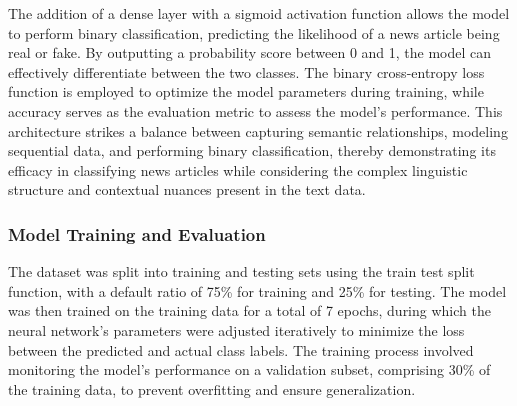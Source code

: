 The addition of a dense layer with a sigmoid activation function allows the model to perform binary classification, predicting the likelihood of a news article being real or fake. By outputting a probability score between 0 and 1, the model can effectively differentiate between the two classes. The binary cross-entropy loss function is employed to optimize the model parameters during training, while accuracy serves as the evaluation metric to assess the model's performance. This architecture strikes a balance between capturing semantic relationships, modeling sequential data, and performing binary classification, thereby demonstrating its efficacy in classifying news articles while considering the complex linguistic structure and contextual nuances present in the text data.


\subsubsection{Model Training and Evaluation}
The dataset was split into training and testing sets using the train test split function, with a default ratio of 75\% for training and 25\% for testing. The model was then trained on the training data for a total of 7 epochs, during which the neural network's parameters were adjusted iteratively to minimize the loss between the predicted and actual class labels. The training process involved monitoring the model's performance on a validation subset, comprising 30\% of the training data, to prevent overfitting and ensure generalization.

